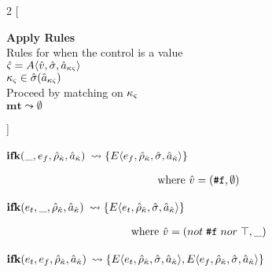 \documentclass[12pt,draft]{article}
\newcommand{\falsesyn}{\texttt{\#f}}
\newcommand{\E}[4]{E\langle #1 , #2 , #3 , #4 \rangle}
\begin{document}
\newpage

\begin{multicols*}{2}
[
\begin{center}
\textbf{Apply Rules} \\
Rules for when the control is a value \\
$\hat{\varsigma} = A\langle \hat{v} , \hat{\sigma} , \hat{a}_{\kappa\varsigma} \rangle$ \\
$\kappa_{\varsigma} \in \hat{\sigma}(\hat{a}_{\kappa\varsigma}) $ \\
Proceed by matching on $\kappa_{\varsigma}$ \\
\vspace{5mm}
$\textbf{mt} \leadsto \emptyset$
\end{center}
\vspace{-5mm}
]
\begin{center}
  $\textbf{ifk}(\_ , e_f, \hat{\rho}_{\hat{\kappa}} , \hat{a}_{\hat{\kappa}})$
  $\leadsto \{\E{e_f}{\aenv_{\akont}}{\astore}{\akaddr}\}$
\end{center}
\vspace{-7mm}
\begin{align*}
\text{where } \aval &= (\falsesyn, \emptyset)
\end{align*}
\begin{center}
  $\textbf{ifk}(e_t , \_ , \hat{\rho}_{\hat{\kappa}} , \hat{a}_{\hat{\kappa}})$
  $\leadsto \{\E{e_t}{\aenv_{\akont}}{\astore}{\akaddr}\}$
\end{center}
\vspace{-7mm}
\begin{align*}
  \text{where } \aval &= (not\;\falsesyn\;nor\;\top , \_)
\end{align*}
\begin{center}
  $\textbf{ifk}(e_t , e_f , \hat{\rho}_{\hat{\kappa}} , \hat{a}_{\hat{\kappa}})$
  $\leadsto \{\E{e_t}{\aenv_{\akont}}{\astore}{\akaddr},
              \E{e_f}{\aenv_{\akont}}{\astore}{\akaddr}\}$
\end{center}
\vspace{-7mm}

\end{multicols*}
\end{document}
